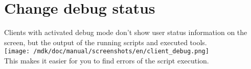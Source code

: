 \section{Change debug status}Clients with activated debug mode don't show user status information on the screen, but the output of the running scripts and executed tools.\\
\texttt{[image: /mdk/doc/manual/screenshots/en/client\_debug.png]} \\
This makes it easier for you to find errors of the script execution.\\
